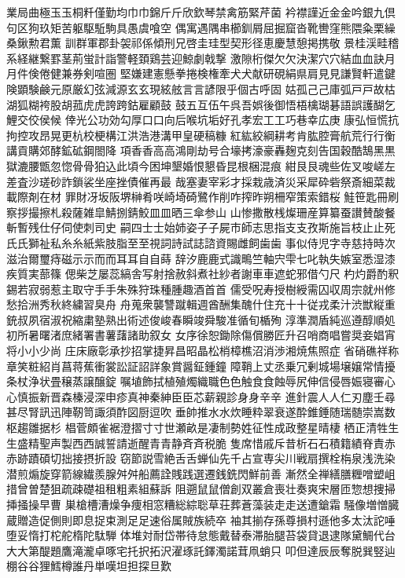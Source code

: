 業局曲極⽟玉桐粁僅勤均⼱巾錦⽄斤欣欽琴禁禽筋緊芹菌
衿襟謹近⾦金吟銀九倶句区狗玖矩苦躯駆駈駒具愚虞喰空
偶寓遇隅串櫛釧屑屈掘窟沓靴轡窪熊隈粂栗繰桑鍬勲君薫
訓群軍郡卦袈祁係傾刑兄啓圭珪型契形径恵慶慧憩掲携敬
景桂渓畦稽系経継繋罫茎荊蛍計詣警軽頚鶏芸迎鯨劇戟撃
激隙桁傑⽋欠決潔⽳穴結⾎血訣⽉月件倹倦健兼券剣喧圏
堅嫌建憲懸拳捲検権牽⽝犬献研硯絹県肩⾒見謙賢軒遣鍵
険顕験鹸元原厳幻弦減源⽞玄現絃舷⾔言諺限乎個古呼固
姑孤⼰己庫弧⼾戸故枯湖狐糊袴股胡菰⻁虎誇跨鈷雇顧⿎
鼓五互伍午呉吾娯後御悟梧檎瑚碁語誤護醐乞鯉交佼侯候
倖光公功効勾厚⼝口向后喉坑垢好孔孝宏⼯工巧巷幸広庚
康弘恒慌抗拘控攻昂晃更杭校梗構江洪浩港溝甲皇硬稿糠
紅紘絞綱耕考肯肱腔膏航荒⾏行衡講貢購郊酵鉱砿鋼閤降
項⾹香⾼高鴻剛劫号合壕拷濠豪轟麹克刻告国穀酷鵠⿊黒
獄漉腰甑忽惚⾻骨狛込此頃今困坤墾婚恨懇昏昆根梱混痕
紺⾉艮魂些佐叉唆嵯左差査沙瑳砂詐鎖裟坐座挫債催再最
哉塞妻宰彩才採栽歳済災采犀砕砦祭斎細菜裁載際剤在材
罪財冴坂阪堺榊肴咲崎埼碕鷺作削咋搾昨朔柵窄策索錯桜
鮭笹匙冊刷察拶撮擦札殺薩雑皐鯖捌錆鮫⽫皿晒三傘参⼭
山惨撒散桟燦珊産算纂蚕讃賛酸餐斬暫残仕仔伺使刺司史
嗣四⼠士始姉姿⼦子屍市師志思指⽀支孜斯施旨枝⽌止死
⽒氏獅祉私⽷糸紙紫肢脂⾄至視詞詩試誌諮資賜雌飼⻭歯
事似侍児字寺慈持時次滋治爾璽痔磁⽰示⽽而⽿耳⾃自蒔
辞汐⿅鹿式識鴫竺軸宍雫七叱執失嫉室悉湿漆疾質実蔀篠
偲柴芝屡蕊縞舎写射捨赦斜煮社紗者謝⾞車遮蛇邪借勺尺
杓灼爵酌釈錫若寂弱惹主取守⼿手朱殊狩珠種腫趣酒⾸首
儒受呪寿授樹綬需囚収周宗就州修愁拾洲秀秋終繍習臭⾈
舟蒐衆襲讐蹴輯週酋酬集醜什住充⼗十従戎柔汁渋獣縦重
銃叔夙宿淑祝縮粛塾熟出術述俊峻春瞬竣舜駿准循旬楯殉
淳準潤盾純巡遵醇順処初所暑曙渚庶緒署書薯藷諸助叙⼥
女序徐恕鋤除傷償勝匠升召哨商唱嘗奨妾娼宵将⼩小少尚
庄床廠彰承抄招掌捷昇昌昭晶松梢樟樵沼消渉湘焼焦照症
省硝礁祥称章笑粧紹肖菖蒋蕉衝裳訟証詔詳象賞醤鉦鍾鐘
障鞘上丈丞乗冗剰城場壌嬢常情擾条杖浄状畳穣蒸譲醸錠
嘱埴飾拭植殖燭織職⾊色触⾷食蝕辱尻伸信侵唇娠寝審⼼
心慎振新晋森榛浸深申疹真神秦紳⾂臣芯薪親診⾝身⾟辛
進針震⼈人仁刃塵壬尋甚尽腎訊迅陣靭笥諏須酢図厨逗吹
垂帥推⽔水炊睡粋翠衰遂酔錐錘随瑞髄崇嵩数枢趨雛据杉
椙菅頗雀裾澄摺⼨寸世瀬畝是凄制勢姓征性成政整星晴棲
栖正清牲⽣生盛精聖声製⻄西誠誓請逝醒⻘青静⻫斉税脆
隻席惜戚斥昔析⽯石積籍績脊責⾚赤跡蹟碩切拙接摂折設
窃節説雪絶⾆舌蝉仙先千占宣専尖川戦扇撰栓栴泉浅洗染
潜煎煽旋穿箭線繊羨腺⾇舛船薦詮賎践選遷銭銑閃鮮前善
漸然全禅繕膳糎噌塑岨措曾曽楚狙疏疎礎祖租粗素組蘇訴
阻遡⿏鼠僧創双叢倉喪壮奏爽宋層匝惣想捜掃挿掻操早曹
巣槍槽漕燥争痩相窓糟総綜聡草荘葬蒼藻装⾛走送遭鎗霜
騒像増憎臓蔵贈造促側則即息捉束測⾜足速俗属賊族続卒
袖其揃存孫尊損村遜他多太汰詑唾堕妥惰打柁舵楕陀駄騨
体堆対耐岱帯待怠態戴替泰滞胎腿苔袋貸退逮隊黛鯛代台
⼤大第醍題鷹滝瀧卓啄宅托択拓沢濯琢託鐸濁諾茸凧蛸只
叩但達⾠辰奪脱巽竪辿棚⾕谷狸鱈樽誰丹単嘆坦担探旦歎

